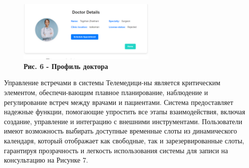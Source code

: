 \begin{figure}[H]
	\centering
	\includegraphics[width=0.6\textwidth]{assets/156}
	\caption*{\bfseries Рис. 6 - Профиль доктора}
\end{figure}
\begin{multicols}{2}


Управление встречами в системы Телемедици-ны является критическим
элементом, обеспечи-вающим плавное планирование, наблюдение и
регулирование встреч между врачами и пациентами. Система предоставляет
надежные функции, помогающие упростить все этапы взаимодействия, включая
создание, управление и интеграцию с внешними инструментами. Пользователи
имеют возможность выбирать доступные временные слоты из динамического
календаря, который отображает как свободные, так и зарезервированные
слоты, гарантируя прозрачность и легкость использования системы для
записи на консультацию на Рисунке 7.
\end{multicols}

